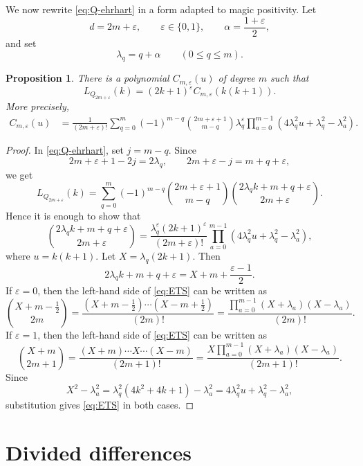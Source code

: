 \documentclass[10pt,a4paper]{amsart}
\newtheorem{Proposition}[Theorem]{Proposition}
\theoremstyle{definition}
\begin{document}
We now rewrite \eqref{eq:Q-ehrhart} in a form adapted to magic positivity.
Let
\[
d=2m+\varepsilon,
\qquad
\varepsilon\in\{0,1\},
\qquad
\alpha=\frac{1+\varepsilon}{2},
\]
and set
\[
\lambda_q=q+\alpha
\qquad(0\le q\le m).
\]

\begin{Proposition}\label{prop:Q-factorization}
There is a polynomial $C_{m,\varepsilon}(u)$ of degree $m$ such that
\[
L_{Q_{2m+\varepsilon}}(k)
=
(2k+1)^\varepsilon
C_{m,\varepsilon}(k(k+1)).
\]
More precisely,
\begin{equation}\label{eq:C-product}
\begin{aligned}
C_{m,\varepsilon}(u)
&=
\frac1{(2m+\varepsilon)!}
\sum_{q=0}^{m}
(-1)^{m-q}
\binom{2m+\varepsilon+1}{m-q}\lambda_q^\varepsilon
\prod_{a=0}^{m-1}
\left(
4\lambda_q^2u+\lambda_q^2-\lambda_a^2
\right).
\end{aligned}
\end{equation}
\end{Proposition}

\begin{proof}
In \eqref{eq:Q-ehrhart}, set $j=m-q$.  Since
\[
2m+\varepsilon+1-2j=2\lambda_q,
\qquad
2m+\varepsilon-j=m+q+\varepsilon,
\]
we get
\[
L_{Q_{2m+\varepsilon}}(k)
=
\sum_{q=0}^{m}
(-1)^{m-q}
\binom{2m+\varepsilon+1}{m-q}
\binom{2\lambda_q k+m+q+\varepsilon}{2m+\varepsilon}.
\]
Hence it is enough to show that 
\begin{equation}\label{eq:ETS}
\binom{2\lambda_q k+m+q+\varepsilon}{2m+\varepsilon}
=
\frac{\lambda_q^\varepsilon(2k+1)^\varepsilon}
{(2m+\varepsilon)!}
\prod_{a=0}^{m-1}
\left(
4\lambda_q^2u+\lambda_q^2-\lambda_a^2
\right),
\end{equation}
where $u=k(k+1)$.
Let $X=\lambda_q(2k+1)$.
Then 
\[
2\lambda_q k+m+q+\varepsilon
=
X+m+\frac{\varepsilon-1}{2}.
\]
If $\varepsilon=0$, then the left-hand side of \eqref{eq:ETS} can be written as
\[
\binom{X +m-\frac1 2}{2m}
=
\frac{(X +m-\frac1 2) \cdots (X -m+\frac1 2) }{(2m)!}
=
\frac{\prod_{a=0}^{m-1} (X + \lambda_a)(X - \lambda_a) }{(2m)!}.
\]
If $\varepsilon=1$,  then the left-hand side of \eqref{eq:ETS} can be written as
\[
\binom{X +m}{2m+1}
=
\frac{(X +m) \cdots X \cdots (X -m) }{(2m+1)!}
=
\frac{X \prod_{a=0}^{m-1} (X + \lambda_a)(X - \lambda_a) }{(2m+1)!}.
\]
Since
\[
X^2-\lambda_a^2
=
\lambda_q^2 (4k^2+4k +1)-\lambda_a^2
=
4\lambda_q^2u+\lambda_q^2-\lambda_a^2,
\]
substitution gives \eqref{eq:ETS} in both
cases.
\end{proof}

\section{Divided differences}\label{sec:dd}
\end{document}
